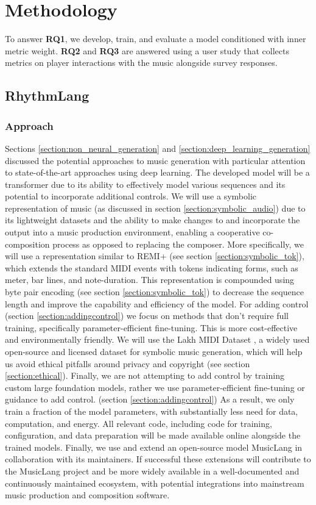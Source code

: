 
\chapter{Methodology}
To answer \textbf{RQ1}, we develop, train, and evaluate a model conditioned with inner metric weight. \textbf{RQ2} and \textbf{RQ3} are answered using a user study that collects metrics on player interactions with the music alongside survey responses. 

\section{RhythmLang}

\subsection{Approach}
Sections \ref{section:non_neural_generation} and \ref{section:deep_learning_generation} discussed the potential approaches to music generation with particular attention to state-of-the-art approaches using deep learning. The developed model will be a transformer due to its ability to effectively model various sequences and its potential to incorporate additional controls. We will use a symbolic representation of music (as discussed in section \ref{section:symbolic_audio}) due to its lightweight datasets and the ability to make changes to and incorporate the output into a music production environment, enabling a cooperative co-composition process as opposed to replacing the composer. More specifically, we will use a representation similar to REMI+ (see section \ref{section:symbolic_tok}), which extends the standard MIDI events with tokens indicating forms, such as meter, bar lines, and note-duration. This representation is compounded using byte pair encoding (see section \ref{section:symbolic_tok}) to decrease the sequence length and improve the capability and efficiency of the model. For adding control (section \ref{section:addingcontrol}) we focus on methods that don't require full training, specifically parameter-efficient fine-tuning. This is more cost-effective and environmentally friendly. 
We will use the Lakh MIDI Dataset \cite{Raffel_2016}, a widely used open-source and licensed dataset for symbolic music generation, which will help us avoid ethical pitfalls around privacy and copyright (see section \ref{section:ethical}). Finally, we are not attempting to add control by training custom large foundation models, rather we use parameter-efficient fine-tuning or guidance to add control. (section \ref{section:addingcontrol}) As a result, we only train a fraction of the model parameters, with substantially less need for data, computation, and energy. All relevant code, including code for training, configuration, and data preparation will be made available online alongside the trained models. Finally, we use and extend an open-source model MusicLang in collaboration with its maintainers. If successful these extensions will contribute to the MusicLang project and be more widely available in a well-documented and continuously maintained ecosystem, with potential integrations into mainstream music production and composition software. 


